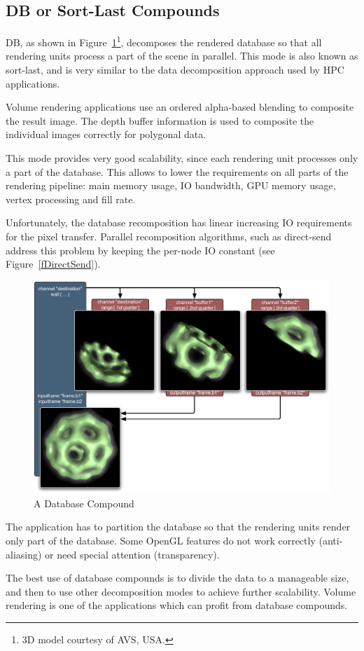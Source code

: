 \documentclass[10pt,a4]{scrartcl}
\newcommand{\fig}[1]{Figure~\ref{#1}}
\begin{document}
\subsection{DB or Sort-Last Compounds}

DB, as shown in \fig{fDB}\footnote{3D model courtesy of AVS, USA.},
decomposes the rendered database so that all rendering units process a
part of the scene in parallel. This mode is also known as sort-last, and
is very similar to the data decomposition approach used by HPC
applications.

Volume rendering applications use an ordered alpha-based blending to
composite the result image. The depth buffer information is used to
composite the individual images correctly for polygonal data. 

This mode provides very good scalability, since each rendering unit
processes only a part of the database. This allows to lower the
requirements on all parts of the rendering pipeline: main memory usage,
IO bandwidth, GPU memory usage, vertex processing and fill rate.

Unfortunately, the database recomposition has linear increasing IO
requirements for the pixel transfer. Parallel recomposition algorithms,
such as direct-send address this problem by keeping the per-node IO
constant (see \fig{fDirectSend}).

\begin{figure}
  \includegraphics[width=.618\textwidth]{images/DB.pdf}
  {\caption{\label{fDB}\small A Database Compound}}
\end{figure}
The application has to partition the database so that the rendering units
render only part of the database. Some OpenGL features do not work
correctly (anti-aliasing) or need special attention (transparency).

The best use of database compounds is to divide the data to a manageable
size, and then to use other decomposition modes to achieve further
scalability. Volume rendering is one of the applications which can
profit from database compounds.
\end{document}
